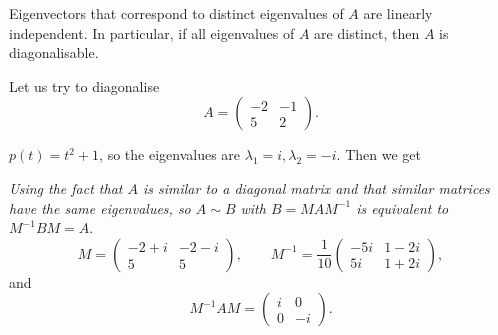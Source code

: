 \documentclass[10pt, a4paper]{article}
\begin{document}
\begin{proposition}
    Eigenvectors that correspond to distinct eigenvalues of $A$ are linearly independent.
    In particular,
    if all eigenvalues of $A$ are distinct,
    then $A$ is diagonalisable.
\end{proposition}

\begin{example}
    Let us try to diagonalise
    \[
    A = \begin{pmatrix}
        -2 & - 1 \\ 5 & 2
    \end{pmatrix}.
    \]
    \begin{solution}
        $p(t) = t ^ 2 + 1$,
        so the eigenvalues are $\lambda_1 = i, \lambda_2 = -i$.
        Then we get
        
        \textit{Using the fact that $A$ is similar to a diagonal matrix and that similar matrices have the same eigenvalues,
        so $A \sim B$ with $B = MAM ^ {-1}$ is equivalent to $M ^ {-1}BM = A$}.
        \[
        M = \begin{pmatrix}
            -2 + i & -2 - i \\ 5 & 5
        \end{pmatrix},
        \qquad
        M ^ {-1} = \frac{1}{10}\begin{pmatrix}
            -5i & 1 - 2i \\ 5i & 1 + 2i
        \end{pmatrix},
        \]
        and
        \[
        M ^ {-1}AM = \begin{pmatrix}
            i & 0 \\ 0 & -i
        \end{pmatrix}.
        \]
    \end{solution}
\end{example}
\end{document}
